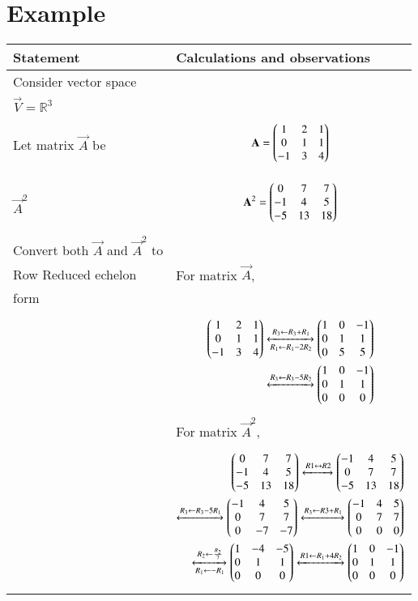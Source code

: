 \documentclass[journal,12pt]{IEEEtran}
\begin{document}
\section{\textbf{Example}}
\renewcommand{\thetable}{4}
\begin{longtable}{|l|l|}
\hline
\endhead
\textbf{Statement}&\textbf{Calculations and observations}\\
\hline
Consider vector space&\\$\vec{V}=\mathbb{R}^3$&\\
Let matrix $\vec{A}$ be&\parbox{11cm}{\begin{align}
    \mathbf{A}=\begin{pmatrix}1&2&1\\0&1&1\\-1&3&4\end{pmatrix}
\end{align}}\\
\hline$\vec{A}^2$&\parbox{11cm}{\begin{align}
    \mathbf{A}^2=\begin{pmatrix}0&7&7\\-1&4&5\\-5&13&18\end{pmatrix}
\end{align}}\\
\hline 
Convert both $\vec{A}$ and $\vec{A}^2$ to&\\Row Reduced echelon&For matrix $\vec{A}$,\\form&\\&\parbox{11cm}{\begin{align}
    \begin{pmatrix}1&2&1\\0&1&1\\-1&3&4\end{pmatrix}&\xleftrightarrow[R_1\leftarrow R_1-2R_2]{R_3\leftarrow R_3+R_1}\begin{pmatrix}1&0&-1\\0&1&1\\0&5&5\end{pmatrix}\\&\xleftrightarrow{R_3\leftarrow R_3-5R_2}\begin{pmatrix}1&0&-1\\0&1&1\\0&0&0\end{pmatrix}\label{Aref}
\end{align}}\\&For matrix $\vec{A}^2$,\\&\parbox{11cm}{\begin{align}
    \myvec{0&7&7\\-1&4&5\\-5&13&18}\xleftrightarrow[]{R1\leftrightarrow R2}\myvec{-1&4&5\\0&7&7\\-5&13&18}\\\xleftrightarrow[]{R_3\leftarrow R_3-5R_1}\myvec{-1&4&5\\0&7&7\\0&-7&-7}\xleftrightarrow[]{R_3\leftarrow R3+R_1}\myvec{-1&4&5\\0&7&7\\0&0&0}\\\xleftrightarrow[R_1\leftarrow -R_1]{R_2\leftarrow\frac{R_2}{7}}\myvec{1&-4&-5\\0&1&1\\0&0&0}\xleftrightarrow[]{R1\leftarrow R_1+4R_2}\myvec{1&0&-1\\0&1&1\\0&0&0}\label{A2ref}

\end{align}}
\end{longtable}
\end{document}
